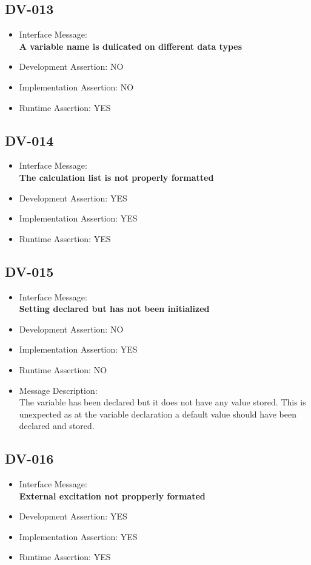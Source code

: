 \subsection{DV-013}
\begin{itemize}
  \item Interface Message:\\[1em]
    \textbf{A variable name is dulicated on different data types}
  \item Development Assertion: NO
  \item Implementation Assertion: NO
  \item Runtime Assertion: YES
\end{itemize}

\subsection{DV-014}
\begin{itemize}
  \item Interface Message:\\[1em]
    \textbf{The calculation list is not properly formatted}
  \item Development Assertion: YES
  \item Implementation Assertion: YES
  \item Runtime Assertion: YES
\end{itemize}

\subsection{DV-015}
\begin{itemize}
  \item Interface Message:\\[1em]
    \textbf{Setting declared but has not been initialized}
  \item Development Assertion: NO
  \item Implementation Assertion: YES
  \item Runtime Assertion: NO
  \item Message Description:\\[1em]
    The variable has been declared but it does not have any value stored. This is unexpected as at the variable declaration a default value should have been declared and stored.
\end{itemize}

\subsection{DV-016}
\begin{itemize}
  \item Interface Message:\\[1em]
    \textbf{External excitation not propperly formated}
  \item Development Assertion: YES
  \item Implementation Assertion: YES
  \item Runtime Assertion: YES
\end{itemize}

